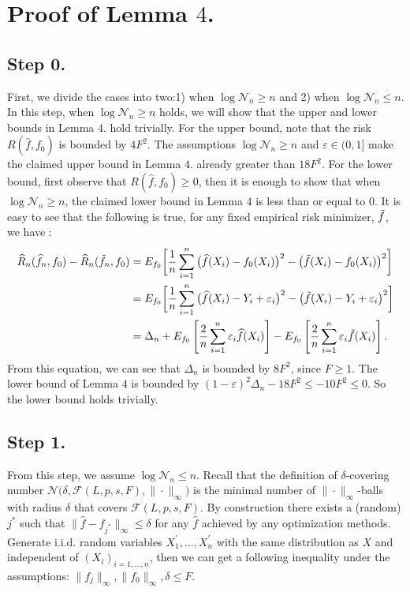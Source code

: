 \documentclass{article}
\theoremstyle{definition}
\begin{document}
\section{Proof of Lemma $4$.}
\subsection{Step 0.}
First, we divide the cases into two:1) when $\log\mathcal{N}_{n}\geq n$ and 2) when $\log\mathcal{N}_{n}\leq n$.
In this step, when $\log\mathcal{N}_{n}\geq n$ holds, we will show that the upper and lower bounds in Lemma $4$. hold trivially.
For the upper bound, note that the risk $R(\widehat{f},f_{0})$ is bounded by $4F^{2}$.
The assumptions $\log\mathcal{N}_{n}\geq n$ and $\varepsilon\in(0,1]$ make the claimed upper bound in Lemma $4$. already greater than $18F^{2}$.
For the lower bound, first observe that $R(\widehat{f},f_{0})\geq 0$, 
then it is enough to show that when $\log\mathcal{N}_{n}\geq n$, the claimed lower bound in Lemma $4$ is less than or equal to $0$.
It is easy to see that the following is true, for any fixed empirical risk minimizer, $\Tilde{f}$, we have : 
\begin{align*}
    \widehat{R}_{n}(\widehat{f}_{n},f_{0})-\widehat{R}_{n}(\Tilde{f}_{n},f_{0})
    &=E_{f_0} \bigg[\frac{1}{n}\sum_{i=1}^{n}\big( \widehat{f}(X_{i})-f_{0}(X_{i}) \big)^{2} - \big( \Tilde{f}(X_{i})-f_{0}(X_{i}) \big)^{2} \bigg]\\
    &=E_{f_0} \bigg[\frac{1}{n}\sum_{i=1}^{n}\big( \widehat{f}(X_{i})-Y_{i}+\varepsilon_{i} \big)^{2} - \big( \Tilde{f}(X_{i})-Y_{i}+\varepsilon_{i} \big)^{2} \bigg]\\
    &=\Delta_{n} + E_{f_{0}}\left[ \frac{2}{n} \sum_{i=1}^{n} \varepsilon_{i} \widehat{f}(X_{i}) \right] - E_{f_{0}}\left[ \frac{2}{n} \sum_{i=1}^{n} \varepsilon_{i} \Tilde{f}(X_{i}) \right].
\end{align*}
From this equation, we can see that $\Delta_{n}$ is bounded by $8F^{2}$, since $F\geq 1$.
The lower bound of Lemma $4$ is bounded by $(1-\varepsilon)^{2}\Delta_{n}-18F^{2}\leq-10F^{2}\leq 0$.
So the lower bound holds trivially.

\subsection{Step 1.}
From this step, we assume $\log\mathcal{N}_{n}\leq n$.
Recall that the definition of $\delta$-covering number $\mathcal{N}\big(\delta,\mathcal{F}(L,p,s,F),\|\cdot\|_{\infty}\big)$ is the minimal number of $\|\cdot\|_{\infty}$-balls with radius $\delta$ that covers $\mathcal{F}(L,p,s,F)$.
By construction there exists a (random) $j^*$ such that $\|\widehat{f}-f_{j^*}\|_{\infty}\leq \delta$ for any $\widehat{f}$ achieved by any optimization methods.
Generate i.i.d. random variables $X^{'}_{1},\dots,X^{'}_{n}$ with the same distribution as $X$ and independent of $(X_{i})_{i=1,\dots,n}$, then we can get a following inequality under the assumptions: $\|f_{j}\|_{\infty},\|f_{0}\|_{\infty},\delta \leq F$.
\end{document}
